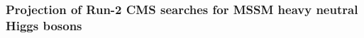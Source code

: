 \subsubsection{Projection of Run-2 CMS searches for MSSM heavy neutral Higgs bosons}\label{sec:CMShtt}


\newcommand{\GeV}{\ensuremath{\text{GeV}\xspace}}
\newcommand{\TeV}{\ensuremath{\text{TeV}\xspace}}






